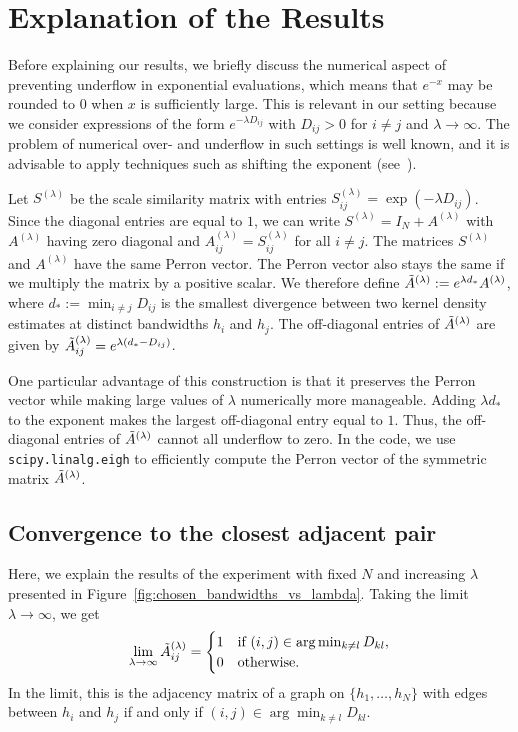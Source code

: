 \section{Explanation of the Results}\label{sec:res_2}

Before explaining our results, we briefly discuss the numerical aspect of preventing underflow in exponential evaluations, which means that $e^{-x}$ may be rounded to $0$ when $x$ is sufficiently large. This is relevant in our setting because we consider expressions of the form $e^{-\lambda D_{ij}}$ with $D_{ij}>0$ for $i\ne j$ and $\lambda\to\infty$. The problem of numerical over- and underflow in such settings is well known, and it is advisable to apply techniques such as shifting the exponent (see~\cite{blanchard_accurate_2019}).

Let $S^{(\lambda)}$ be the scale similarity matrix with entries $S^{(\lambda)}_{ij}=\exp{(-\lambda D_{ij})}$. Since the diagonal entries are equal to $1$, we can write $S^{(\lambda)}=I_N+A^{(\lambda)}$ with $A^{(\lambda)}$ having zero diagonal and $A^{(\lambda)}_{ij}=S^{(\lambda)}_{ij}$ for all $i\ne j$. The matrices $S^{(\lambda)}$ and $A^{(\lambda)}$ have the same Perron vector. The Perron vector also stays the same if we multiply the matrix by a positive scalar. We therefore define $\Tilde{A}^{(\lambda)}:=e^{\lambda d_{\ast}}A^{(\lambda)}$, where $d_{\ast}:=\min_{i\ne j}D_{ij}$ is the smallest divergence between two kernel density estimates at distinct bandwidths $h_i$ and $h_j$. The off-diagonal entries of $\Tilde{A}^{(\lambda)}$ are given by $\Tilde{A}^{(\lambda)}_{ij}=e^{\lambda(d_{\ast}-D_{ij})}$.

One particular advantage of this construction is that it preserves the Perron vector while making large values of $\lambda$ numerically more manageable. Adding $\lambda d_{\ast}$ to the exponent makes the largest off-diagonal entry equal to $1$. Thus, the off-diagonal entries of $\Tilde{A}^{(\lambda)}$ cannot all underflow to zero. In the code, we use \texttt{scipy.linalg.eigh} to efficiently compute the Perron vector of the symmetric matrix $\Tilde{A}^{(\lambda)}$.


\subsection{Convergence to the closest adjacent pair}

Here, we explain the results of the experiment with fixed $N$ and increasing $\lambda$ presented in Figure~\ref{fig:chosen_bandwidths_vs_lambda}. Taking the limit $\lambda\to\infty$, we get
\begin{align*}
    \lim\limits_{\lambda\to\infty}\Tilde{A}_{ij}^{(\lambda)}=\begin{cases}
        1 & \text{if }(i,j)\in\arg\min_{k\ne l}D_{kl},\\
        0 & \text{otherwise}.
    \end{cases}
\end{align*}
In the limit, this is the adjacency matrix of a graph on $\{h_1,\dots,h_N\}$ with edges between $h_i$ and $h_j$ if and only if $(i,j)\in\arg\min_{k\ne l}D_{kl}$.

